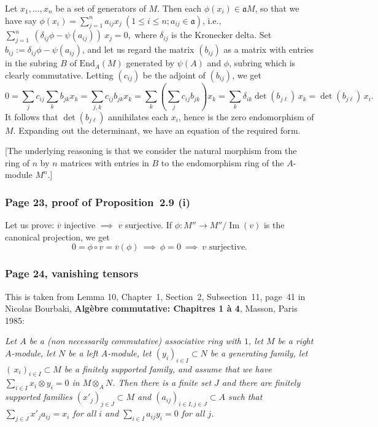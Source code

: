 \documentclass[12pt,letterpaper]{article}%
\newcommand{\oo}{\operatorname}\newcommand{\ooo}{\operatorname*}
\newcommand{\mf}{\mathfrak}
\newcommand{\aaa}{\mf a}
\newcommand{\nn}{\noindent}
\begin{document}
\nn Let $x_1,\dots,x_n$ be a set of generators of $M$. Then each $\phi(x_i)\in\aaa M$, so that we have say $\phi(x_i)=\sum_{j=1}^na_{ij}x_j\ (1\le i\le n; a_{ij}\in\aaa)$, i.e., $
\sum_{j=1}^n\ (\delta_{ij}\phi-\psi(a_{ij}))\ x_j=0,$ where $\delta_{ij}$ is the Kronecker delta. Set $b_{ij}:=\delta_{ij}\phi-\psi(a_{ij})$, and let us regard the matrix $(b_{ij})$ as a matrix with entries in the subring $B$ of $\text{End}_A(M)$ generated by $\psi(A)$ and $\phi$, subring which is clearly commutative. Letting $(c_{ij})$ be the adjoint of $(b_{ij})$, we get 
$$
0=\sum_jc_{ij}\sum_kb_{jk}x_k=\sum_{j,k}c_{ij}b_{jk}x_k=\sum_k\left(\sum_jc_{ij}b_{jk}\right)x_k=\sum_k\delta_{ik}\det(b_{j\ell})\,x_k=\det(b_{j\ell})\,x_i.
$$ 
It follows that $\det(b_{j\ell})$ annihilates each $x_i$, hence is the zero endomorphism of $M$. Expanding out the determinant, we have an equation of the required form.

[The underlying reasoning is that we consider the natural morphism from the ring of $n$ by $n$ matrices with entries in $B$ to the endomorphism ring of the $A$-module $M^n$.] 

\subsubsection{Page 23, proof of Proposition~2.9 (i)}%

Let us prove: $\overline v$ injective $\implies$ $v$ surjective. If $\phi:M''\to M''/\oo{Im}(v)$ is the canonical projection, we get 
$$
0=\phi\circ v=\overline v(\phi)\ \implies\ \phi=0\ \implies\ v\text{ surjective.}
$$

\subsubsection{Page 24, vanishing tensors}\label{vt}%

This is taken from Lemma 10, Chapter~1, Section~2, Subsection~11, page~41 in Nicolas Bourbaki, \textbf{Algèbre commutative: Chapitres 1 à 4}, Masson, Paris 1985:

\nn\emph{Let $A$ be a (non necessarily commutative) associative ring with $1$, let $M$ be a right $A$-module, let $N$ be a left $A$-module, let $(y_i)_{i\in I}\subset N$ be a generating family, let $(\,x_i)_{i\in I}\subset M$ be a finitely supported family, and assume that we have $\sum_{i\in I}x_i\otimes y_i=0$ in $M\otimes_AN$. Then there is a finite set $J$ and there are finitely supported families $(x'_j)_{j\in J}\subset M$ and $(a_{ij})_{i\in I,j\in J}\subset A$ such that $\sum_{j\in J} x'_ja_{ij}=x_i$ for all $i$ and $\sum_{i\in I}a_{ij}y_i=0$ for all $j$.}
\end{document}
